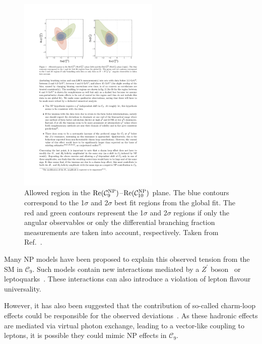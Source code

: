 \begin{figure}[!tb]
\centering
\includegraphics[trim={2.5cm 20cm 10.7cm 2.4cm},clip,width=0.6\textwidth]{figs/kpimm/introduction/c9c10.pdf}
\caption{Allowed region in the ${\rm Re}(\mathcal{C}_{9}^{\rm NP})$--${\rm Re}(\mathcal{C}_{10}^{\rm NP})$ plane. The blue contours correspond to the 1$\sigma$ and 2$\sigma$ best fit regions from the global fit. The red and green contours represent the 1$\sigma$ and 2$\sigma$ regions if only the \BdToKstmmP angular observables or only the differential branching fraction measurements are taken into account, respectively. Taken from Ref.~\cite{Altmannshofer:2015sma}.}
\label{fig:kpimm:c9c10}
\end{figure}

Many NP models have been proposed to explain this observed tension from the SM in $\mathcal{C}_{9}$. Such models contain new interactions mediated by a $Z^{'}$ boson~\cite{Gauld:2013qja,Altmannshofer:2014cfa,Crivellin:2015mga} or leptoquarks~\cite{Sahoo:2015wya,Biswas:2014gga,Hiller:2014ula}. These interactions can also introduce a violation of lepton flavour universality.

However, it has also been suggested that the contribution of so-called charm-loop effects could be responsible for the observed deviations~\cite{Lyon:2014hpa}. As these hadronic effects are mediated via virtual photon exchange, leading to a vector-like coupling to leptons, it is possible they could mimic NP effects in $\mathcal{C}_{9}$.

